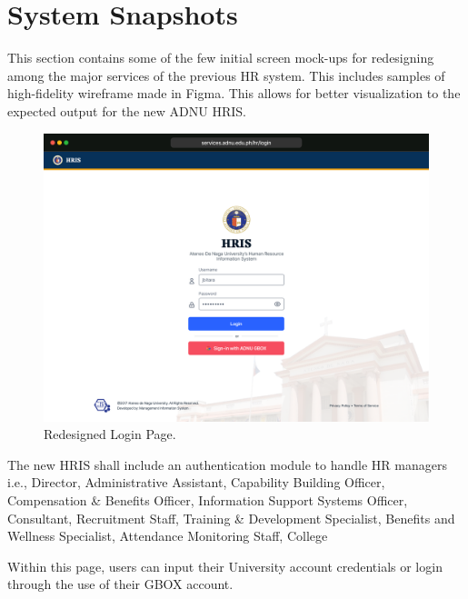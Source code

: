 \section{System Snapshots}

This section contains some of the few initial screen mock-ups for redesigning among the major services of the previous HR system. This includes samples of high-fidelity wireframe made in Figma. This allows for better visualization to the expected output for the new ADNU HRIS.

    \begin{figure}[H]
        \centering
        \includegraphics[width=1\linewidth]{figures/app/login.png}
        \caption{Redesigned Login Page.}
        \label{fig:app-login}
    \end{figure}

    The new HRIS shall include an authentication module to handle HR managers i.e., Director, Administrative Assistant, Capability Building Officer, Compensation \& Benefits Officer, Information Support Systems Officer, Consultant, Recruitment Staff, Training \& Development Specialist, Benefits and Wellness Specialist, Attendance Monitoring Staff, College
    
    Within this page, users can input their University account credentials or login through the use of their GBOX account.

